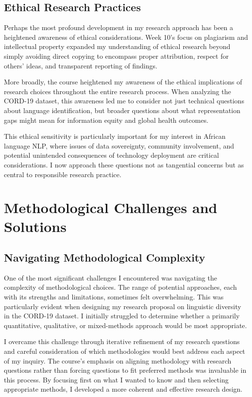 \documentclass[
]{article}
\begin{document}
\subsection{Ethical Research
Practices}\label{ethical-research-practices}

Perhaps the most profound development in my research approach has been a
heightened awareness of ethical considerations. Week 10's focus on
plagiarism and intellectual property expanded my understanding of
ethical research beyond simply avoiding direct copying to encompass
proper attribution, respect for others' ideas, and transparent reporting
of findings.

More broadly, the course heightened my awareness of the ethical
implications of research choices throughout the entire research process.
When analyzing the CORD-19 dataset, this awareness led me to consider
not just technical questions about language identification, but broader
questions about what representation gaps might mean for information
equity and global health outcomes.

This ethical sensitivity is particularly important for my interest in
African language NLP, where issues of data sovereignty, community
involvement, and potential unintended consequences of technology
deployment are critical considerations. I now approach these questions
not as tangential concerns but as central to responsible research
practice.

\section{Methodological Challenges and
Solutions}\label{methodological-challenges-and-solutions}

\subsection{Navigating Methodological
Complexity}\label{navigating-methodological-complexity}

One of the most significant challenges I encountered was navigating the
complexity of methodological choices. The range of potential approaches,
each with its strengths and limitations, sometimes felt overwhelming.
This was particularly evident when designing my research proposal on
linguistic diversity in the CORD-19 dataset. I initially struggled to
determine whether a primarily quantitative, qualitative, or
mixed-methods approach would be most appropriate.

I overcame this challenge through iterative refinement of my research
questions and careful consideration of which methodologies would best
address each aspect of my inquiry. The course's emphasis on aligning
methodology with research questions rather than forcing questions to fit
preferred methods was invaluable in this process. By focusing first on
what I wanted to know and then selecting appropriate methods, I
developed a more coherent and effective research design.
\end{document}

